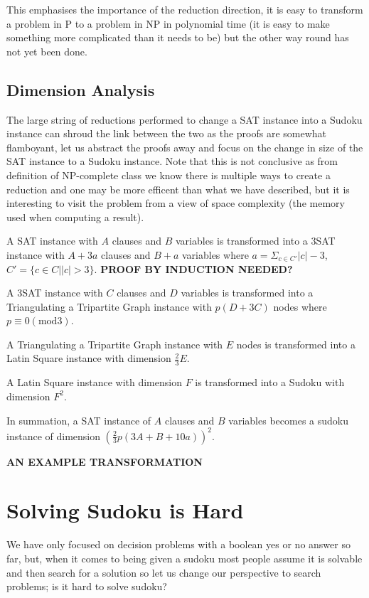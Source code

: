 \documentclass[a4paper,11pt]{report}
\begin{document}
This emphasises the importance of the reduction direction, it is easy to transform a problem in P to a problem in NP in polynomial time (it is easy to make something more complicated than it needs to be) but the other way round has not yet been done. 

\subsection{Dimension Analysis}

The large string of reductions performed to change a SAT instance into a Sudoku instance can shroud the link between the two as the proofs are somewhat flamboyant, let us abstract the proofs away and focus on the change in size of the SAT instance to a Sudoku instance. Note that this is not conclusive as from definition of NP-complete class we know there is multiple ways to create a reduction and one may be more efficent than what we have described, but it is interesting to visit the problem from a view of space complexity (the memory used when computing a result).

A SAT instance with $A$ clauses and $B$ variables is transformed into a 3SAT instance with $A + 3a$ clauses and $B+a$ variables where $a=\Sigma_{c\in C'}|c|-3$, $C'=\{c\in C | |c|>3\}$. \textbf{PROOF BY INDUCTION NEEDED?}

A 3SAT instance with $C$ clauses and $D$ variables is transformed into a Triangulating a Tripartite Graph instance with $p(D+3C)$ nodes where $p\equiv 0 (\text{mod}3)$.

A Triangulating a Tripartite Graph instance with $E$ nodes is transformed into a Latin Square instance with dimension $\frac{2}{3}E$.

A Latin Square instance with dimension $F$ is transformed into a Sudoku with dimension $F^2$.

In summation, a SAT instance of $A$ clauses and $B$ variables becomes a sudoku instance of dimension $(\frac{2}{3}p(3A+B+10a))^2 $.

\textbf{AN EXAMPLE TRANSFORMATION}

\section{Solving Sudoku is Hard}

We have only focused on decision problems with a boolean yes or no answer so far, but, when it comes to being given a sudoku most people assume it is solvable and then search for a solution so let us change our perspective to search problems; is it hard to solve sudoku? 
\end{document}
